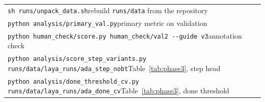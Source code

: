 \documentclass[10pt,a4paper]{article}
\newcommand{\code}[1]{\texttt{#1}}
\begin{document}
\begin{tabular}{@{}l@{}}
\code{sh runs/unpack\_data.sh}\quad rebuild \code{runs/data} from the repository\\
\code{python analysis/primary\_val.py}\quad primary metric on validation\\
\code{python human\_check/score.py human\_check/val2 -{}-guide v3}\quad annotation check\\
\code{python analysis/score\_step\_variants.py runs/data/laya\_runs/ada\_step\_nobt}\quad Table~\ref{tab:phase3}, step head\\
\code{python analysis/done\_threshold\_cv.py runs/data/laya\_runs/ada\_done\_cv}\quad Table~\ref{tab:phase3}, done threshold
\end{tabular}
\end{document}
